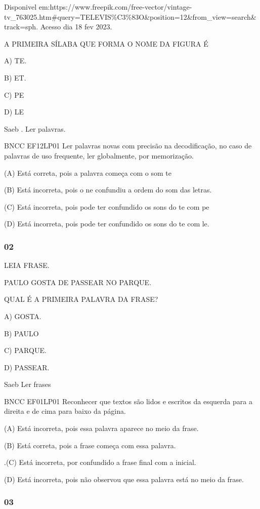 Disponivel
em:https://www.freepik.com/free-vector/vintage-tv\_763025.htm\#query=TELEVIS\%C3\%83O\&position=12\&from\_view=search\&track=sph.
Acesso dia 18 fev 2023.

A PRIMEIRA SÍLABA QUE FORMA O NOME DA FIGURA É

A) TE.

B) ET.

C) PE

D) LE

Saeb . Ler palavras.

BNCC EF12LP01 Ler palavras novas com precisão na decodificação, no caso
de palavras de uso frequente, ler globalmente, por memorização.

(A) Está correta, pois a palavra começa com o som te

(B) Está incorreta, pois o ne confundiu a ordem do som das letras.

\protect\hypertarget{_heading=h.3rdcrjn}{}{}(C) Está incorreta, pois
pode ter confundido os sons do te com pe

(D) Está incorreta, pois pode ter confundido os sons do te com le.

\subsubsection{02 }\label{section-5}

LEIA FRASE.

PAULO GOSTA DE PASSEAR NO PARQUE.

QUAL É A PRIMEIRA PALAVRA DA FRASE?

A) GOSTA.

B) PAULO

C) PARQUE.

D) PASSEAR.

Saeb Ler frases

BNCC EF01LP01 Reconhecer que textos são lidos e escritos da esquerda
para a direita e de cima para baixo da página.

(A) Está incorreta, pois essa palavra aparece no meio da frase.

(B) Está correta, pois a frase começa com essa palavra.

.(C) Está incorreta, por confundido a frase final com a inicial.

(D) Está incorreta, pois não observou que essa palavra está no meio da
frase.

\subsubsection{03 }\label{section-6}

